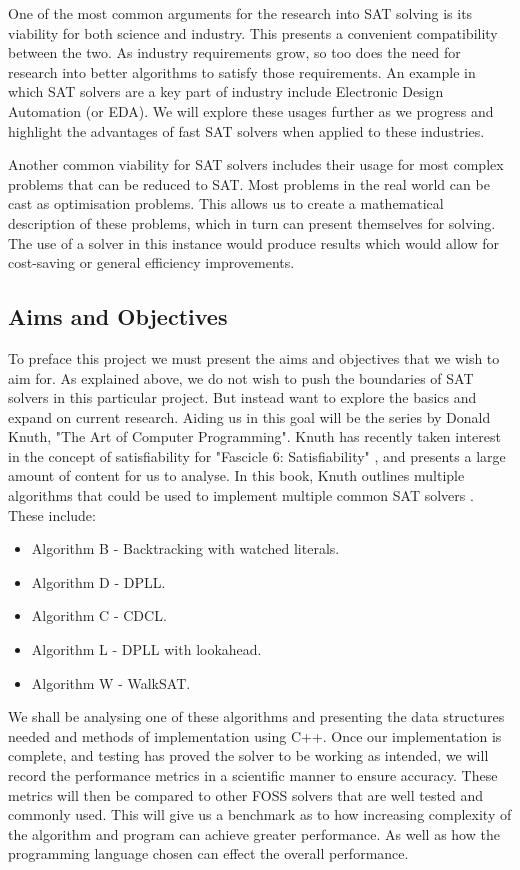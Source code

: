 \documentclass{article}
\begin{document}
One of the most common arguments for the research into SAT solving is its viability for both science and industry. This presents
a convenient compatibility between the two. As industry requirements grow, so too does the need for research into better
algorithms to satisfy those requirements. An example in which SAT solvers are a key part of industry include Electronic Design
Automation (or EDA). We will explore these usages further as we progress and highlight the advantages of fast SAT solvers when
applied to these industries.

Another common viability for SAT solvers includes their usage for most complex problems that can be reduced to SAT. Most problems
in the real world can be cast as optimisation problems. This allows us to create a mathematical description of these problems,
which in turn can present themselves for solving. The use of a solver in this instance would produce results which would allow
for cost-saving or general efficiency improvements.

\subsection{Aims and Objectives}
To preface this project we must present the aims and objectives that we wish to aim for. As explained above, we do not wish to
push the boundaries of SAT solvers in this particular project. But instead want to explore the basics and expand on current
research. Aiding us in this goal will be the series by Donald Knuth, "The Art of Computer Programming". Knuth has recently taken
interest in the concept of satisfiability for "Fascicle 6: Satisfiability" , and presents a large amount of content for us to
analyse. In this book, Knuth outlines multiple algorithms that could be used to implement multiple common SAT solvers\cite{donald}
. These include:

\begin{itemize}
    \item Algorithm B - Backtracking with watched literals.
    \item Algorithm D - DPLL.
    \item Algorithm C - CDCL.
    \item Algorithm L - DPLL with lookahead.
    \item Algorithm W - WalkSAT.
\end{itemize}

We shall be analysing one of these algorithms and presenting the data structures needed and methods of implementation using C++.
Once our implementation is complete, and testing has proved the solver to be working as intended, we will record the performance
metrics in a scientific manner to ensure accuracy. These metrics will then be compared to other FOSS solvers that are well tested
and commonly used. This will give us a benchmark as to how increasing complexity of the algorithm and program can achieve greater
performance. As well as how the programming language chosen can effect the overall performance.
\end{document}
